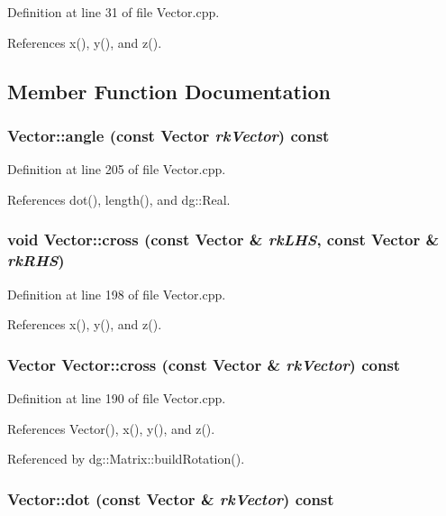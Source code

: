 Definition at line 31 of file Vector.cpp.

References x(), y(), and z().

\subsection{Member Function Documentation}
\subsubsection{ Vector::angle (const Vector {\em rk\-Vector}) const}\label{classdg_1_1Vector_a38}




Definition at line 205 of file Vector.cpp.

References dot(), length(), and dg::Real.
\subsubsection{\setlength{\rightskip}{0pt plus 5cm}void Vector::cross (const Vector \& {\em rk\-LHS}, const Vector \& {\em rk\-RHS})}\label{classdg_1_1Vector_a37}




Definition at line 198 of file Vector.cpp.

References x(), y(), and z().
\subsubsection{\setlength{\rightskip}{0pt plus 5cm}Vector Vector::cross (const Vector \& {\em rk\-Vector}) const}\label{classdg_1_1Vector_a36}




Definition at line 190 of file Vector.cpp.

References Vector(), x(), y(), and z().

Referenced by dg::Matrix::build\-Rotation().
\subsubsection{ Vector::dot (const Vector \& {\em rk\-Vector}) const}\label{classdg_1_1Vector_a35}




